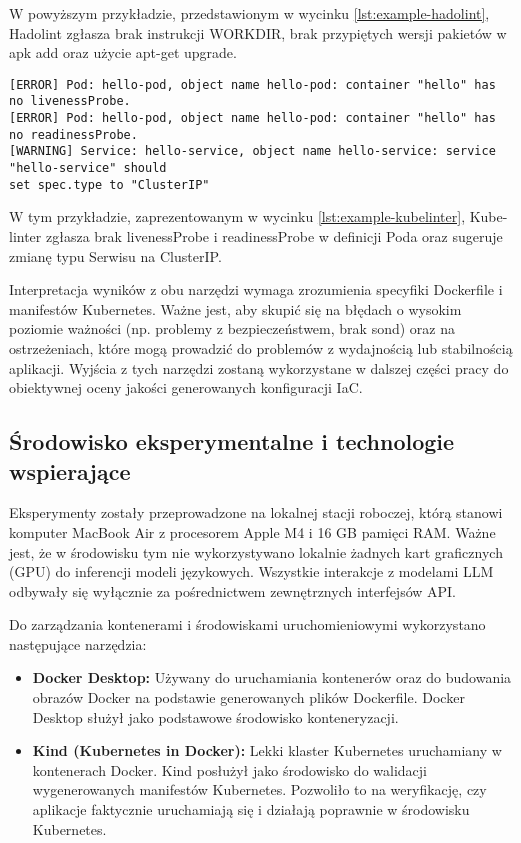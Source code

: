 W powyższym przykładzie, przedstawionym w wycinku \ref{lst:example-hadolint}, Hadolint zgłasza brak instrukcji WORKDIR, brak przypiętych wersji pakietów w apk add oraz użycie apt-get upgrade.

\begin{lstlisting}[caption={Przykład wyników Kube-linter},label={lst:example-kubelinter},captionpos=b,columns=fullflexible, breaklines=true]
[ERROR] Pod: hello-pod, object name hello-pod: container "hello" has no livenessProbe.
[ERROR] Pod: hello-pod, object name hello-pod: container "hello" has no readinessProbe.
[WARNING] Service: hello-service, object name hello-service: service "hello-service" should
set spec.type to "ClusterIP"
\end{lstlisting}

W tym przykładzie, zaprezentowanym w wycinku \ref{lst:example-kubelinter}, Kube-linter zgłasza brak livenessProbe i readinessProbe w definicji Poda oraz sugeruje zmianę typu Serwisu na ClusterIP.

Interpretacja wyników z obu narzędzi wymaga zrozumienia specyfiki Dockerfile i manifestów Kubernetes. Ważne jest, aby skupić się na błędach o wysokim poziomie ważności (np. problemy z bezpieczeństwem, brak sond) oraz na ostrzeżeniach, które mogą prowadzić do problemów z wydajnością lub stabilnością aplikacji. Wyjścia z tych narzędzi zostaną wykorzystane w dalszej części pracy do obiektywnej oceny jakości generowanych konfiguracji IaC.

\subsection{Środowisko eksperymentalne i technologie wspierające}

Eksperymenty zostały przeprowadzone na lokalnej stacji roboczej, którą stanowi komputer MacBook Air z procesorem Apple M4 i 16 GB pamięci RAM. Ważne jest, że w środowisku tym nie wykorzystywano lokalnie żadnych kart graficznych (GPU) do inferencji modeli językowych. Wszystkie interakcje z modelami LLM odbywały się wyłącznie za pośrednictwem zewnętrznych interfejsów API.

Do zarządzania kontenerami i środowiskami uruchomieniowymi wykorzystano następujące narzędzia:
\begin{itemize}
	\item \textbf{Docker Desktop:} \cite{docker_desktop} Używany do uruchamiania kontenerów oraz do budowania obrazów Docker na podstawie generowanych plików Dockerfile. Docker Desktop służył jako podstawowe środowisko konteneryzacji.
	\item \textbf{Kind (Kubernetes in Docker):} \cite{kind} Lekki klaster Kubernetes uruchamiany w kontenerach Docker. Kind posłużył jako środowisko do walidacji wygenerowanych manifestów Kubernetes. Pozwoliło to na weryfikację, czy aplikacje faktycznie uruchamiają się i działają poprawnie w środowisku Kubernetes.
\end{itemize}

